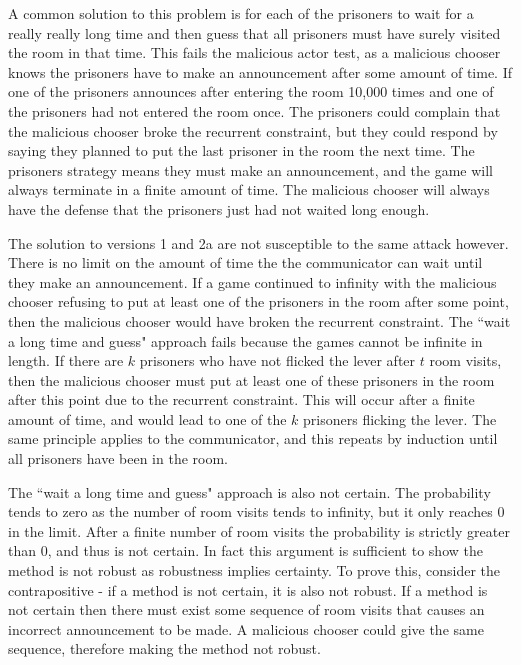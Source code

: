 A common solution to this problem is for each of the prisoners to wait for a really really long time and then guess that all prisoners must have surely visited the room in that time. This fails the malicious actor test, as a malicious chooser knows the prisoners have to make an announcement after some amount of time. If one of the prisoners announces after entering the room 10,000 times and one of the prisoners had not entered the room once. The prisoners could complain that the malicious chooser broke the recurrent constraint, but they could respond by saying they planned to put the last prisoner in the room the next time. The prisoners strategy means they must make an announcement, and the game will always terminate in a finite amount of time. The malicious chooser will always have the defense that the prisoners just had not waited long enough.

The solution to versions 1 and 2a are not susceptible to the same attack however. There is no limit on the amount of time the the communicator can wait until they make an announcement. If a game continued to infinity with the malicious chooser refusing to put at least one of the prisoners in the room after some point, then the malicious chooser would have broken the recurrent constraint. The ``wait a long time and guess" approach fails because the games cannot be infinite in length. If there are $k$ prisoners who have not flicked the lever after $t$ room visits, then the malicious chooser must put at least one of these prisoners in the room after this point due to the recurrent constraint. This will occur after a finite amount of time, and would lead to one of the $k$ prisoners flicking the lever. The same principle applies to the communicator, and this repeats by induction until all prisoners have been in the room.

The ``wait a long time and guess" approach is also not certain. The probability tends to zero as the number of room visits tends to infinity, but it only reaches 0 in the limit. After a finite number of room visits the probability is strictly greater than 0, and thus is not certain. In fact this argument is sufficient to show the method is not robust as robustness implies certainty. To prove this, consider the contrapositive - if a method is not certain, it is also not robust. If a method is not certain then there must exist some sequence of room visits that causes an incorrect announcement to be made. A malicious chooser could give the same sequence, therefore making the method not robust.

